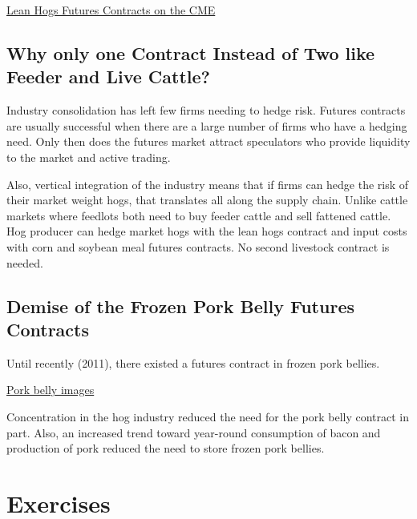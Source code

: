 \documentclass[
  letterpaper,
  DIV=11,
  numbers=noendperiod]{scrreprt}
\begin{document}
\href{http://www.cmegroup.com/trading/agricultural/livestock/lean-hogs.html}{Lean
Hogs Futures Contracts on the CME}

\hypertarget{why-only-one-contract-instead-of-two-like-feeder-and-live-cattle}{%
\subsection{Why only one Contract Instead of Two like Feeder and Live
Cattle?}\label{why-only-one-contract-instead-of-two-like-feeder-and-live-cattle}}

Industry consolidation has left few firms needing to hedge risk. Futures
contracts are usually successful when there are a large number of firms
who have a hedging need. Only then does the futures market attract
speculators who provide liquidity to the market and active trading.

Also, vertical integration of the industry means that if firms can hedge
the risk of their market weight hogs, that translates all along the
supply chain. Unlike cattle markets where feedlots both need to buy
feeder cattle and sell fattened cattle. Hog producer can hedge market
hogs with the lean hogs contract and input costs with corn and soybean
meal futures contracts. No second livestock contract is needed.

\hypertarget{demise-of-the-frozen-pork-belly-futures-contracts}{%
\subsection{Demise of the Frozen Pork Belly Futures
Contracts}\label{demise-of-the-frozen-pork-belly-futures-contracts}}

Until recently (2011), there existed a futures contract in frozen pork
bellies.

\href{https://www.google.com/search?q=pork+belly\&biw=1920\&bih=1075\&noj=1\&source=lnms\&tbm=isch\&sa=X\&ved=0CAgQ_AUoAmoVChMIhbO55IqdyQIVDNUeCh0_owNp}{Pork
belly images}

Concentration in the hog industry reduced the need for the pork belly
contract in part. Also, an increased trend toward year-round consumption
of bacon and production of pork reduced the need to store frozen pork
bellies.

\hypertarget{exercises-7}{%
\section{Exercises}\label{exercises-7}}
\end{document}
